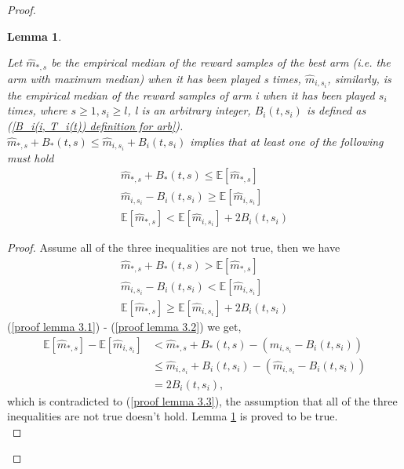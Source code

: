 \documentclass{article}
\theoremstyle{plain}
\newtheorem{lemma}{Lemma}
\begin{document}
\begin{proof}
\begin{lemma}
\label{lemma 3 normal}

Let $\hat{m}_{*, s}$ be the empirical median of the reward samples of the best arm (i.e. the arm with maximum median) when it has been played s times, $\hat{m}_{i, s_i}$, similarly, is the empirical median of the reward samples of arm i when it has been played $s_i$ times, where $s \geq 1, s_i \geq l$, l is an arbitrary integer,  $B_i(t, s_i)$ is defined as (\ref{B_i(i, T_i(t)) definition for arb}).\\

    $\hat{m}_{*, s} + B_*(t, s)  \leq \hat{m}_{i, s_i} + B_i(t, s_i)$ implies that at least one of the following must hold
    \begin{align}
        \label{lemma 3.1}
        \hat{m}_{*, s} + B_*(t, s) \leq  \mathbb{E}[\hat{m}_{*, s}]\\
        \label{lemma 3.2}
        \hat{m}_{i, s_i} - B_i(t, s_i) \geq \mathbb{E}[\hat{m}_{i, s_i}]\\
        \label{lemma 3.3}
        \mathbb{E}[\hat{m}_{*, s}] < \mathbb{E}[\hat{m}_{i, s_i}] + 2 B_i(t, s_i)
    \end{align}
\end{lemma}

\begin{proof}
Assume all of the three inequalities are not true, then we have
    \begin{align}
        \label{proof lemma 3.1}
         \hat{m}_{*, s} + B_*(t, s) >  \mathbb{E}[\hat{m}_{*, s}]\\
        \label{proof lemma 3.2}
        \hat{m}_{i, s_i} - B_i(t, s_i) < \mathbb{E}[\hat{m}_{i, s_i}]\\
        \label{proof lemma 3.3}
        \mathbb{E}[\hat{m}_{*, s}] \geq \mathbb{E}[\hat{m}_{i, s_i}] + 2 B_i(t, s_i)
    \end{align}
    (\ref{proof lemma 3.1}) - (\ref{proof lemma 3.2}) we get, 
    \begin{align}
         \mathbb{E}[\hat{m}_{*, s}] - \mathbb{E}[\hat{m}_{i, s_i}] &< 
         \hat{m}_{*, s} + B_*(t, s) - (\hat{m}_{i, s_i} - B_i(t, s_i)) \\
        & \leq \hat{m}_{i, s_i} + B_i(t, s_i) - (\hat{m}_{i, s_i} - B_i(t, s_i)) \\
        &= 2 B_i(t, s_i),
    \end{align}
    which is contradicted to (\ref{proof lemma 3.3}), the assumption that all of the three inequalities are not true doesn't hold. Lemma \ref{lemma 3 normal} is proved to be true.\\
\end{proof}


\end{proof}
\end{document}
